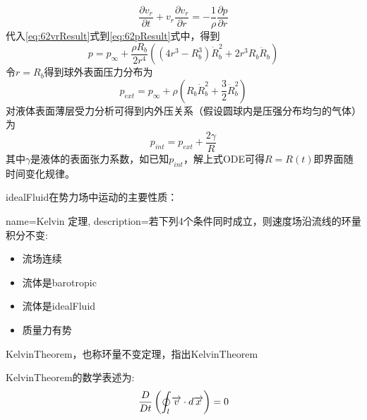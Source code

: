 \begin{equation}\label{eq:62pResult}
\frac{\partial v_r}{\partial t}+v_r \frac{\partial v_r}{\partial r}=-\frac{1}{\rho}\frac{\partial p}{\partial r}
\end{equation}
代入\eqref{eq:62vrResult}式到\eqref{eq:62pResult}式中，得到
\begin{equation}
p=p_{\infty}+\frac{\rho R_b}{2r^4}((4r^3-R_b^3)\dot{R}_b^2+2r^3R_b\ddot{R}_b)
\end{equation}
令$r=R_b$得到球外表面压力分布为
\begin{equation}
p_{ext}=p_{\infty}+\rho(R_b\dot{R}_b^2+\frac{3}{2}\dot{R}_b^2)
\end{equation}
对液体表面薄层受力分析可得到内外压关系（假设圆球内是压强分布均匀的气体）为
\begin{equation}
p_{int}=p_{ext}+\frac{2\gamma}{R}
\end{equation}
其中$\gamma$是液体的表面张力系数，如已知$p_{int}$，解上式ODE可得$R=R(t)$即界面随时间变化规律。

\gls{idealFluid}在势力场中运动的主要性质：
{
  name=Kelvin 定理,
  description=若下列4个条件同时成立，则速度场沿流线的环量积分不变:
\begin{itemize}
\item 流场连续
\item 流体是\gls{barotropic}
\item 流体是\gls{idealFluid}
\item 质量力有势
\end{itemize}
}
\gls{KelvinTheorem}，也称环量不变定理，指出\glsdesc{KelvinTheorem}

\gls{KelvinTheorem}的数学表述为:
\begin{equation}\label{eq:62KelvinMath}
\frac{D}{Dt} \left(\oint_{l}\overrightarrow{v}\cdot d\overrightarrow{x}\right) =0
\end{equation}


